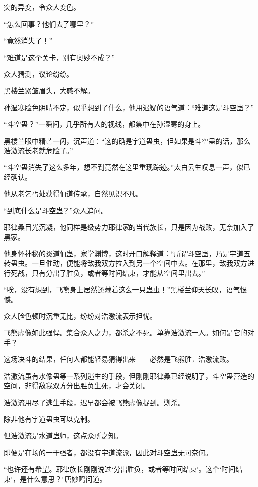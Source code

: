 
\begin{this_body}

突的异变，令众人变色。

“怎么回事？他们去了哪里？”

“竟然消失了！”

“难道是这个关卡，别有奥妙不成？”

众人猜测，议论纷纷。

黑楼兰紧皱眉头，大惑不解。

孙湿寒脸色阴晴不定，似乎想到了什么，他用迟疑的语气道：“难道这是斗空蛊？”

“斗空蛊？”一瞬间，几乎所有人的视线，都集中在孙湿寒的身上。

黑楼兰眼中精芒一闪，沉声道：“这的确是宇道蛊虫，但如果是斗空蛊的话，那么浩激流长老就危险了。”

“斗空蛊消失了这么多年，想不到竟然在这里重现踪迹。”太白云生叹息一声，似已经确认。

他从老乞丐处获得仙道传承，自然见识不凡。

“到底什么是斗空蛊？”众人追问。

耶律桑目光沉凝，他同样是级势力耶律家的当代族长，只是因为战败，无奈加入了黑家。

他身怀神秘的炎道仙蛊，家学渊博，这时开口解释道：“所谓斗空蛊，乃是宇道五转蛊虫。一旦催动，便能将敌我双方拉入到另一个空间中去。在那里，敌我双方进行死战，只有分出了胜负，或者等时间结束，才能从空间里出去。”

“唉，没有想到，飞熊身上居然还藏着这么一只蛊虫！”黑楼兰仰天长叹，语气恨憾。

众人脸色顿时沉重无比，纷纷对浩激流表示担忧。

飞熊虚像如此强悍。集合众人之力，都杀之不死。单靠浩激流一人。如何是它的对手？

这场决斗的结果，任何人都能轻易猜得出来——必然是飞熊胜，浩激流败。

浩激流虽有水像蛊等一系列逃生的手段，但刚刚耶律桑已经说明了，斗空蛊营造的空间，非得敌我双方分出胜负生死，才会关闭。

浩激流用尽了逃生手段，迟早都会被飞熊虚像捉到。剿杀。

除非他有宇道蛊虫可以克制。

但浩激流是水道蛊师，这点众所之知。

即便是在场的一干强者，都没有宇道流派，因此对斗空蛊无可奈何。

“也许还有希望。耶律族长刚刚说过‘分出胜负，或者等时间结束’。这个‘时间结束’，是什么意思？”唐妙鸣问道。


\end{this_body}
